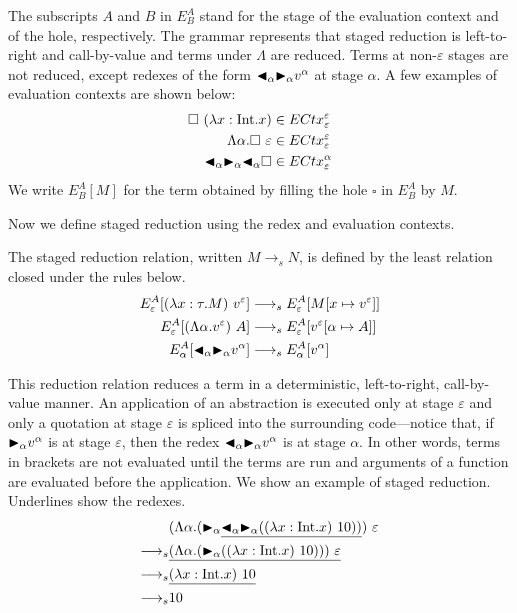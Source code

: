 The subscripts $A$ and $B$ in $E^A_B$ stand for the stage of the evaluation
context and of the hole, respectively. The grammar represents that staged
reduction is left-to-right and call-by-value and terms under \(\Lambda\) are
reduced. Terms at non-$\varepsilon$ stages are not reduced, except redexes of
the form \({\mathop{\blacktriangleleft}}_\alpha {\mathop{\blacktriangleright}}_\alpha v^\alpha\) at stage \(\alpha\).  A few
examples of evaluation contexts are shown below:
\begin{align*}
  \square\ (\lambda x:\textrm{Int}.x)                  & \in  ECtx^\varepsilon_\varepsilon \\
  \Lambda\alpha.\square\ \varepsilon            & \in ECtx^\varepsilon_\varepsilon  \\
  {\mathop{\blacktriangleleft}}_\alpha {\mathop{\blacktriangleright}}_\alpha {\mathop{\blacktriangleleft}}_\alpha \square & \in ECtx^\alpha_\varepsilon
\end{align*}
We write $E^A_B[M]$ for the term obtained by filling the hole $\square$ in $E^A_B$ by $M$.

Now we define staged reduction using the redex and evaluation contexts.

\begin{definition}\sloppy
  The staged reduction relation, written $M \longrightarrow_s N$, is defined by
  the least relation closed under the rules below.
  \begin{align*}
    E^A_\varepsilon [(\lambda x:\tau.M)\ v^\varepsilon] & \longrightarrow_s E^A_\varepsilon[M[x\mapsto v^\varepsilon]]      \\
    E^A_\varepsilon [(\Lambda\alpha.v^\varepsilon)\ A]  & \longrightarrow_s E^A_\varepsilon[v^\varepsilon[\alpha\mapsto A]] \\
    E^A_\alpha [{\mathop{\blacktriangleleft}}_\alpha {\mathop{\blacktriangleright}}_\alpha v^\alpha]        & \longrightarrow_s E^A_\alpha[v^\alpha]                            \\
  \end{align*}
\end{definition}

This reduction relation reduces a term in a deterministic, left-to-right,
call-by-value manner. An application of an abstraction is executed only at
stage \(\varepsilon\) and only a quotation at stage \(\varepsilon\) is spliced
into the surrounding code---notice that, if \({\mathop{\blacktriangleright}}_\alpha v^\alpha\) is at stage
\(\varepsilon\), then the redex \({\mathop{\blacktriangleleft}}_\alpha {\mathop{\blacktriangleright}}_\alpha v^\alpha\) is at stage
\(\alpha\). In other words, terms in brackets are not evaluated until the terms
are run and arguments of a function are evaluated before the application.  We
show an example of staged reduction. Underlines show the redexes.
\begin{align*}
                    & (\Lambda\alpha.(\TB_\alpha \underline{\TBL_\alpha \TB_\alpha ((\lambda x:\I.x)\ 10))})\ \varepsilon \\
  \longrightarrow_s & \underline{(\Lambda\alpha.(\TB_\alpha ((\lambda x:\I.x)\ 10)))\ \varepsilon}                        \\
  \longrightarrow_s & \underline{(\lambda x:\I.x)\ 10}                                                                    \\
  \longrightarrow_s & 10
\end{align*}
